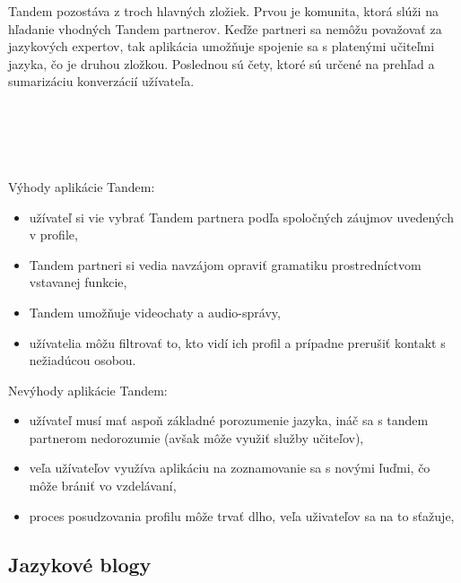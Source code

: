 \documentclass[10pt,oneside,slovak,a4paper]{article}
\begin{document}
Tandem pozostáva z troch hlavných zložiek. Prvou je komunita, ktorá slúži na hľadanie vhodných Tandem partnerov. Keďže partneri sa nemôžu považovať za jazykových expertov, tak aplikácia umožňuje spojenie sa s platenými učiteľmi jazyka, čo je druhou zložkou. Poslednou sú čety, ktoré sú určené na prehľad a sumarizáciu konverzácií užívateľa.\\\\\\\\\\\\
Výhody aplikácie Tandem: 
\begin{itemize}
\item užívateľ si vie vybrať Tandem partnera podľa spoločných záujmov uvedených v profile,\cite{tandem}
\item Tandem partneri si vedia navzájom opraviť gramatiku prostredníctvom vstavanej funkcie,
\item Tandem umožňuje videochaty \cite{tandem} a audio-správy,
\item užívatelia môžu filtrovať to, kto vidí ich profil a prípadne prerušiť kontakt s nežiadúcou osobou. \cite{tandem}
\end{itemize}
Nevýhody aplikácie Tandem:
\begin{itemize}
\item užívateľ musí mať aspoň základné porozumenie jazyka, ináč sa s tandem partnerom nedorozumie (avšak môže využiť služby učiteľov), \cite{tandem}
\item veľa užívateľov využíva aplikáciu na zoznamovanie sa s novými ľuďmi, čo môže brániť vo vzdelávaní, \cite{tandem}
\item proces posudzovania profilu môže trvať dlho, veľa uživateľov sa na to sťažuje, \cite{tandem}
\end{itemize}

\subsection{Jazykové blogy} %
\end{document}
